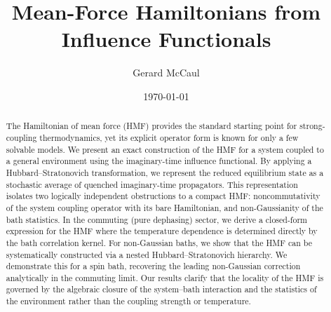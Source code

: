 \documentclass[aps,prl,twocolumn,superscriptaddress,showpacs]{revtex4-2}
\begin{document}
\title{Mean-Force Hamiltonians from Influence Functionals}
\author{Gerard McCaul}
\date{\today}

\begin{abstract}
The Hamiltonian of mean force (HMF) provides the standard starting point for strong-coupling thermodynamics, yet its explicit operator form is known for only a few solvable models. We present an exact construction of the HMF for a system coupled to a general environment using the imaginary-time influence functional. By applying a Hubbard--Stratonovich transformation, we represent the reduced equilibrium state as a stochastic average of quenched imaginary-time propagators. This representation isolates two logically independent obstructions to a compact HMF: noncommutativity of the system coupling operator with its bare Hamiltonian, and non-Gaussianity of the bath statistics. In the commuting (pure dephasing) sector, we derive a closed-form expression for the HMF where the temperature dependence is determined directly by the bath correlation kernel. For non-Gaussian baths, we show that the HMF can be systematically constructed via a nested Hubbard--Stratonovich hierarchy. We demonstrate this for a spin bath, recovering the leading non-Gaussian correction analytically in the commuting limit. Our results clarify that the locality of the HMF is governed by the algebraic closure of the system--bath interaction and the statistics of the environment rather than the coupling strength or temperature.
\end{abstract}

\maketitle










\end{document}
